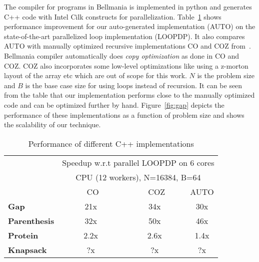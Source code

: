 The compiler for programs in Bellmania is implemented in 
python and generates C++ code with Intel Cilk constructs for parallelization.
Table~\ref{evaluation:cppruntimes} shows performance improvement for our 
auto-generated implementation (AUTO) on the state-of-the-art parallelized 
loop implementation (LOOPDP). It also compares AUTO with manually 
optimized recursive implementations CO and COZ from~\cite{IPDPS15/Tithi}. 
Bellmania compiler automatically does \textit{copy optimization} 
as done in CO and COZ. COZ also incorporates some low-level 
optimizations like using a z-morton layout of the array etc 
which are out of scope for this work. %
$N$ is the problem size and $B$ is the base case size for using loops 
instead of recursion. It can be seen from the table that our implementation 
performs close to the manually optimized code and can be optimized further by 
hand. Figure~\ref{fig:gap} depicts the performance of these implementations 
as a function of problem size and shows the scalability of our technique. %

\begin{table}
\centering
\begin{tabular}{|l|c|c|c|}
    \cline{2-4}
  \multicolumn{1}{c|}{} & \multicolumn{3}{c|}{\scriptsize Speedup w.r.t parallel LOOPDP on 6 cores}  \\
  \multicolumn{1}{c|}{} & \multicolumn{3}{c|}{\scriptsize   CPU (12 workers), N=16384, B=64}  \\
  \multicolumn{1}{c|}{} & \multicolumn{1}{c|}{~~~~~~\sf CO~~~~~} & \multicolumn{1}{c|}{~~~~~\sf COZ~~~~} & \multicolumn{1}{c|}{\sf AUTO}  \\
  \hline
  {\bf Gap}  & 21x & 34x & 30x\\
  \hline
  {\bf Parenthesis}  & 32x & 50x & 46x\\
  \hline
  {\bf Protein} & 2.2x & 2.6x & 1.4x \\
  \hline
  {\bf Knapsack} & ?x & ?x & ?x\\
  \hline
\end{tabular}
\caption{\label{evaluation:cppruntimes}
  Performance of different C++ implementations}
\end{table}


